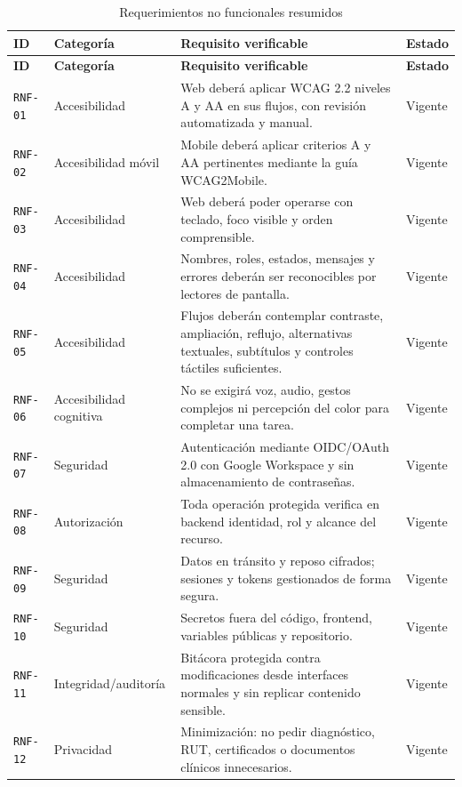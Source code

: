 \documentclass[10pt,a4paper,oneside]{article}
\newcommand{\id}[1]{\texttt{#1}}
\begin{document}
\scriptsize
\begin{longtable}{@{}L{0.075\textwidth}L{0.16\textwidth}L{0.60\textwidth}L{0.10\textwidth}@{}}
\caption{Requerimientos no funcionales resumidos}\label{tab:rnf-sintesis}\\
\toprule\textbf{ID} & \textbf{Categoría} & \textbf{Requisito verificable} & \textbf{Estado}\\\midrule
\endfirsthead\toprule\textbf{ID} & \textbf{Categoría} & \textbf{Requisito verificable} & \textbf{Estado}\\\midrule\endhead
\bottomrule\endfoot
\id{RNF-01} & Accesibilidad & Web deberá aplicar WCAG 2.2 niveles A y AA en sus flujos, con revisión automatizada y manual. & Vigente\\
\id{RNF-02} & Accesibilidad móvil & Mobile deberá aplicar criterios A y AA pertinentes mediante la guía WCAG2Mobile. & Vigente\\
\id{RNF-03} & Accesibilidad & Web deberá poder operarse con teclado, foco visible y orden comprensible. & Vigente\\
\id{RNF-04} & Accesibilidad & Nombres, roles, estados, mensajes y errores deberán ser reconocibles por lectores de pantalla. & Vigente\\
\id{RNF-05} & Accesibilidad & Flujos deberán contemplar contraste, ampliación, reflujo, alternativas textuales, subtítulos y controles táctiles suficientes. & Vigente\\
\id{RNF-06} & Accesibilidad cognitiva & No se exigirá voz, audio, gestos complejos ni percepción del color para completar una tarea. & Vigente\\
\id{RNF-07} & Seguridad & Autenticación mediante OIDC/OAuth 2.0 con Google Workspace y sin almacenamiento de contraseñas. & Vigente\\
\id{RNF-08} & Autorización & Toda operación protegida verifica en backend identidad, rol y alcance del recurso. & Vigente\\
\id{RNF-09} & Seguridad & Datos en tránsito y reposo cifrados; sesiones y tokens gestionados de forma segura. & Vigente\\
\id{RNF-10} & Seguridad & Secretos fuera del código, frontend, variables públicas y repositorio. & Vigente\\
\id{RNF-11} & Integridad/auditoría & Bitácora protegida contra modificaciones desde interfaces normales y sin replicar contenido sensible. & Vigente\\
\id{RNF-12} & Privacidad & Minimización: no pedir diagnóstico, RUT, certificados o documentos clínicos innecesarios. & Vigente\\

\end{longtable}
\end{document}
